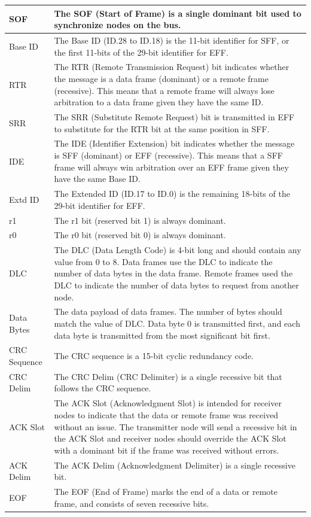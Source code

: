 \begin{longtable}[c]{|p{3.5cm}|p{12cm}|}
    SOF & The SOF (Start of Frame) is a single dominant bit used to synchronize nodes on the bus.
          \\\hline
    Base ID & The Base ID (ID.28 to ID.18) is the 11-bit identifier for SFF, or the first 11-bits of the 29-bit identifier for EFF.
          \\\hline
    RTR & The RTR (Remote Transmission Request) bit indicates whether the message is a data frame (dominant) or a remote frame (recessive). This means that a remote frame will always lose arbitration to a data frame given they have the same ID.                                                    \\\hline
    SRR & The SRR (Substitute Remote Request) bit is transmitted in EFF to substitute for the RTR bit at the same position in SFF.                       
           \\\hline
    IDE & The IDE (Identifier Extension) bit indicates whether the message is SFF (dominant) or EFF (recessive). This means that a SFF frame will always win arbitration over an EFF frame given they have the same Base ID.
            \\\hline
    Extd ID & The Extended ID (ID.17 to ID.0) is the remaining 18-bits of the 29-bit identifier for EFF.
            \\\hline
    r1 & The r1 bit (reserved bit 1) is always dominant.
             \\\hline 
    r0 & The r0 bit (reserved bit 0) is always dominant.
             \\\hline
    DLC & The DLC (Data Length Code) is 4-bit long and should contain any value from 0 to 8. Data frames use the DLC to indicate the number of data bytes in the data frame. Remote frames used the DLC to indicate the number of data bytes to request from another node. 
             \\\hline
    Data Bytes & The data payload of data frames. The number of bytes should match the value of DLC. Data byte 0 is transmitted first, and each data byte is transmitted from the most significant bit first.
             \\\hline
    CRC Sequence & The CRC sequence is a 15-bit cyclic redundancy code.
             \\\hline
    CRC Delim & The CRC Delim (CRC Delimiter) is a single recessive bit that follows the CRC sequence.
              \\\hline
    ACK Slot & The ACK Slot (Acknowledgment Slot) is intended for receiver nodes to indicate that the data or remote frame was received without an issue. The transmitter node will send a recessive bit in the ACK Slot and receiver nodes should override the ACK Slot with a dominant bit if the frame was received without errors.
              \\\hline
    ACK Delim & The ACK Delim (Acknowledgment Delimiter) is a single recessive bit.
              \\\hline
    EOF & The EOF (End of Frame) marks the end of a data or remote frame, and consists of seven recessive bits.
              \\\hline
\end{longtable}
